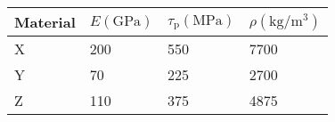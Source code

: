 \begin{tabular}{|l|l|l|l|}
\hline
Material & $E(\mathrm{GPa})$ & $\tau_{\mathrm{p}}(\mathrm{MPa})$ & $\rho\left(\mathrm{kg} / \mathrm{m}^3\right)$ \\
\hline X & 200 & 550 & 7700 \\
Y & 70 & 225 & 2700 \\
Z & 110 & 375 & 4875 \\
\hline
\end{tabular}